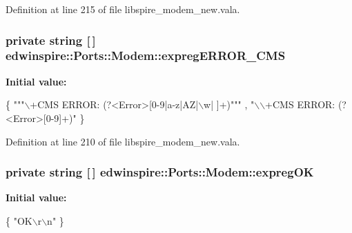 Definition at line 215 of file libspire\-\_\-modem\-\_\-new.\-vala.

\hypertarget{classedwinspire_1_1Ports_1_1Modem_a448a92a7d7a84ef666f02584c819b1cf}{
\subsubsection[{expreg\-E\-R\-R\-O\-R\-\_\-\-C\-M\-S}]{\setlength{\rightskip}{0pt plus 5cm}private string \mbox{[}$\,$\mbox{]} edwinspire\-::\-Ports\-::\-Modem\-::expreg\-E\-R\-R\-O\-R\-\_\-\-C\-M\-S\hspace{0.3cm}{\ttfamily [private]}}}\label{classedwinspire_1_1Ports_1_1Modem_a448a92a7d7a84ef666f02584c819b1cf}
{\bfseries Initial value\-:}
\begin{DoxyCode}
 \{
                                \textcolor{stringliteral}{""}\textcolor{stringliteral}{"\(\backslash\)+CMS ERROR: (?<Error>[0-9|a-z|AZ|\(\backslash\)w| ]+)"}\textcolor{stringliteral}{""}
      ,
                                \textcolor{stringliteral}{"\(\backslash\)\(\backslash\)+CMS ERROR: (?<Error>[0-9]+)"}
                        \}
\end{DoxyCode}


Definition at line 210 of file libspire\-\_\-modem\-\_\-new.\-vala.

\hypertarget{classedwinspire_1_1Ports_1_1Modem_a94bb15b8aeb4d5fa3b8749d6dc2684cc}{
\subsubsection[{expreg\-O\-K}]{\setlength{\rightskip}{0pt plus 5cm}private string \mbox{[}$\,$\mbox{]} edwinspire\-::\-Ports\-::\-Modem\-::expreg\-O\-K\hspace{0.3cm}{\ttfamily [private]}}}\label{classedwinspire_1_1Ports_1_1Modem_a94bb15b8aeb4d5fa3b8749d6dc2684cc}
{\bfseries Initial value\-:}
\begin{DoxyCode}
 \{
                                \textcolor{stringliteral}{"OK\(\backslash\)r\(\backslash\)n"}
                        \}
\end{DoxyCode}


